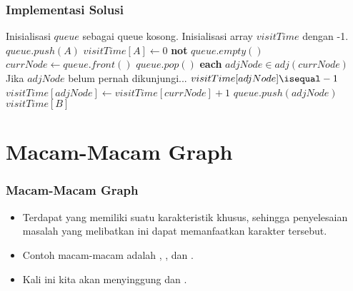 \begin{frame}[fragile]
\frametitle{Implementasi Solusi}
\begin{codebox}
  \li \Comment Inisialisasi $queue$ sebagai queue kosong.
  \li \Comment Inisialisasi array $visitTime$ dengan -1.
  \li $queue.push(A)$
  \li $visitTime[A] \gets 0$
  \li \While \textbf{not} $queue.empty()$ \Do
  \li   $currNode \gets queue.front()$
  \li   $queue.pop()$
  \li   \For \textbf{each} $adjNode \in adj(currNode)$ \Do
  \li     \Comment Jika $adjNode$ belum pernah dikunjungi...
  \li     \If $visitTime[adjNode] \isequal -1$ \Then
  \li       $visitTime[adjNode] \gets visitTime[currNode] + 1$
  \li       $queue.push(adjNode)$
          \End
        \End
      \End
  \li \Return $visitTime[B]$
\end{codebox}
\end{frame}

\section{Macam-Macam Graph}
\frame{\sectionpage}

\begin{frame}
\frametitle{Macam-Macam Graph}
\begin{itemize}
  \item Terdapat \fGraph yang memiliki suatu karakteristik khusus, sehingga penyelesaian masalah yang melibatkan \fgraph ini dapat memanfaatkan karakter tersebut.
  \item Contoh macam-macam \fgraph adalah , , dan .
  \item Kali ini kita akan menyinggung \fTree dan .
\end{itemize}
\end{frame}

